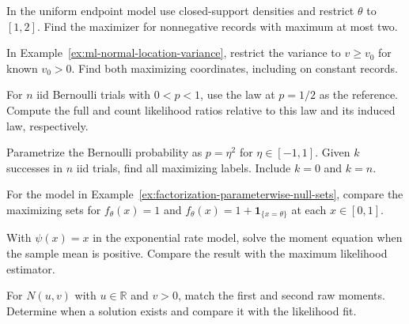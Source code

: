 \documentclass[11pt,oneside]{book}
\theoremstyle{definition}
\theoremstyle{remark}
\newcommand{\R}{\mathbb R}
\begin{document}
\begin{practiceexercise}
\label{pex:ml-uniform-restricted-endpoint}
In the uniform endpoint model use closed-support densities and
restrict $\theta$ to $[1,2]$. Find the maximizer for nonnegative
records with maximum at most two.
\end{practiceexercise}

\begin{practiceexercise}
\label{pex:ml-normal-variance-floor}
In Example~\ref{ex:ml-normal-location-variance}, restrict the
variance to $v\geq v_0$ for known $v_0>0$. Find both maximizing
coordinates, including on constant records.
\end{practiceexercise}

\begin{practiceexercise}
\label{pex:ml-count-ratio-reference}
For $n$ iid Bernoulli trials with $0<p<1$, use the law at
$p=1/2$ as the reference. Compute the full and count likelihood
ratios relative to this law and its induced law, respectively.
\end{practiceexercise}

\begin{practiceexercise}
\label{pex:ml-bernoulli-squared-parameter}
Parametrize the Bernoulli probability as $p=\eta^2$ for
$\eta\in[-1,1]$. Given $k$ successes in $n$ iid trials, find
all maximizing labels. Include $k=0$ and $k=n$.
\end{practiceexercise}

\begin{practiceexercise}
\label{pex:ml-pointwise-density-modification}
For the model in Example~\ref{ex:factorization-parameterwise-null-sets},
compare the maximizing sets for $f_\theta(x)=1$ and
$f_\theta(x)=1+\mathbf 1_{\{x=\theta\}}$ at each $x\in[0,1]$.
\end{practiceexercise}

\begin{practiceexercise}
\label{pex:mom-exponential-rate}
With $\psi(x)=x$ in the exponential rate model, solve the
moment equation when the sample mean is positive. Compare the
result with the maximum likelihood estimator.
\end{practiceexercise}

\begin{practiceexercise}
\label{pex:mom-normal-two-moments}
For $N(u,v)$ with $u\in\R$ and $v>0$, match the first and second
raw moments. Determine when a solution exists and compare it
with the likelihood fit.
\end{practiceexercise}
\end{document}
